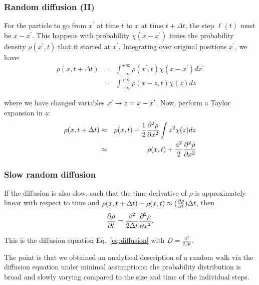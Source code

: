 \documentclass[hyperref={colorlinks=true}]{beamer}
\begin{document}

\begin{frame}%
  \frametitle{Random diffusion (II)}
  
  For the particle to go from $x^{\prime}$ at time $t$ to $x$ at time $t+\Delta t$, the step $\ell(t)$ must be $x - x^{\prime}$. This happens with probability $\chi(x - x^{\prime})$ times the probability density $\rho(x^{\prime} , t)$ that it started at $x^{\prime}$. Integrating over original positions $x^{\prime}$, we have:
  \begin{eqnarray}
    \rho(x, t + \Delta t) &=& \int_{-\infty}^{+\infty} \rho(x^{\prime}, t) \chi(x - x^{\prime}) dx^{\prime} \\
                          &=& \int_{-\infty}^{+\infty} \rho(x - z, t) \chi(z) dz
  \end{eqnarray}

  where we have changed variables $x^{\prime} \rightarrow z = x - x^{\prime}$. Now, perform a Taylor expansion in $z$:
  \begin{eqnarray}
    \rho(x, t + \Delta t) &\approx& \rho(x,t) + \frac{1}{2} \frac{\partial^2 \rho}{\partial x^2} \int z^2 \chi(z) dz \\
                          &\approx& \rho(x,t) + \frac{a^2}{2} \frac{\partial^2 \rho}{\partial x^2}
  \end{eqnarray}

\end{frame}


\begin{frame}%
  \frametitle{Slow random diffusion}
  
  If the diffusion is also slow, such that the time derivative of $\rho$ is approximately linear with respect to time and $\rho(x, t + \Delta t) - \rho(x, t) \approx (\frac{\partial \rho}{\partial t}) \Delta t$, then
  \begin{eqnarray}
    \frac{\partial \rho}{\partial t} = \frac{a^2}{2 \Delta t} \frac{\partial^2 \rho}{\partial x^2}.
  \end{eqnarray}

  This is the diffusion equation Eq.~\ref{eq:diffusion} with $D=\frac{a^2}{2 \Delta t}$.
  
  \vspace{0.3cm}
  
  The point is that we obtained an analytical description of a random walk via the diffusion equation under minimal assumptions: the probability distribution is broad and slowly varying compared to the size and time of the individual steps.

\end{frame}
\end{document}
